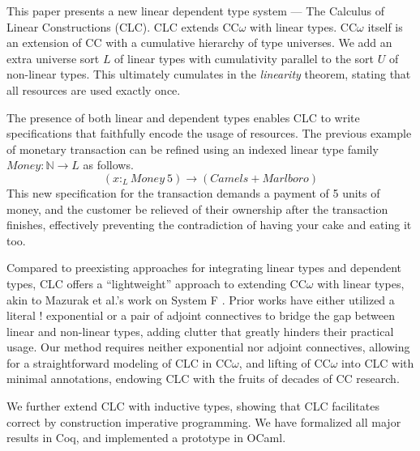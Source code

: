 \documentclass[sigplan,screen]{acmart}
\theoremstyle{definition}
\newcommand{\ltype}{:_{\scriptscriptstyle L}}
\begin{document}
  This paper presents a new linear dependent type system --- The Calculus of Linear Constructions (CLC). CLC extends CC$\omega$ with linear types. CC$\omega$ itself is an extension of CC with a cumulative hierarchy of type universes. We add an extra universe sort $L$ of linear types with cumulativity parallel to the sort $U$ of non-linear types. This ultimately cumulates in the \textit{linearity} theorem, stating that all resources are used exactly once.

  The presence of both linear and dependent types enables CLC to write specifications that faithfully encode the usage of resources. The previous example of monetary transaction can be refined using an indexed linear type family $Money : \mathbb{N} \rightarrow L$ as follows.
  \begin{equation*}
    (x \ltype Money\ 5) \rightarrow (Camels + Marlboro)
  \end{equation*}
  This new specification for the transaction demands a payment of 5 units of money, and the customer be relieved of their ownership after the transaction finishes, effectively preventing the contradiction of having your cake and eating it too.

  Compared to preexisting approaches for integrating linear types and dependent types, CLC offers a ``lightweight'' approach to extending CC$\omega$ with linear types, akin to Mazurak et al.'s work on System F \cite{mazurak}. Prior works have either utilized a literal ! exponential or a pair of adjoint connectives to bridge the gap between linear and non-linear types, adding clutter that greatly hinders their practical usage. Our method requires neither exponential nor adjoint connectives, allowing for a straightforward modeling of CLC in CC$\omega$, and lifting of CC$\omega$ into CLC with minimal annotations, endowing CLC with the fruits of decades of CC research. 
  
  We further extend CLC with inductive types, showing that CLC facilitates correct by construction imperative programming. We have formalized all major results in Coq, and implemented a prototype in OCaml. 
\end{document}
